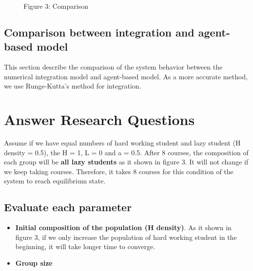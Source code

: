\documentclass[a4paper, 12pt]{article}
\begin{document}
\begin{figure}[!h]
\begin{minipage}[t]{0.25\textwidth}
		\begin{small}
			\centering
			\textsf{\footnotesize Figure 3: Comparison}
		\end{small}
		\label{fig2}
	\end{minipage}
\end{figure}
\vspace{-3mm}
\subsection{Comparison between integration and agent-based model}
This section describe the comparison of the system behavior between the numerical integration model and agent-based model. As a more accurate method, we use Runge-Kutta’s method for integration.

\section{Answer Research Questions}
Assume if we have equal numbers of hard working student and lazy student (H density = 0.5), the H = 1, L = 0 and a = 0.5. After 8 courses, the composition of each group will be \textbf{all lazy students} as it shown in figure 3. It will not change if we keep taking courses. Therefore, it takes 8 courses for this condition of the system to reach equilibrium state. 
\subsection{Evaluate each parameter}
\begin{itemize}[nolistsep]
	\item \textbf{Initial composition of the population (H density)}. As it shown in figure 3, if we only increase the population of hard working student in the beginning, it will take longer time to converge.
	\item \textbf{Group size} 
\end{itemize}
\end{document}
